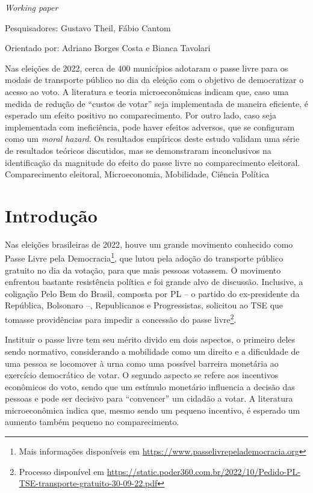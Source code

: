     {
      \noindent \textit{Working paper}
    
      \noindent Pesquisadores: Gustavo Theil, Fábio Cantom

      \noindent Orientado por: Adriano Borges Costa e Bianca Tavolari

        
    }
    {
        Nas eleições de 2022, cerca de 400 municípios adotaram o passe livre para os modais de transporte público no dia da eleição com o objetivo de democratizar o acesso ao voto. A literatura e teoria microeconômicas indicam que, caso uma medida de redução de ``custos de votar'' seja implementada de maneira eficiente, é esperado um efeito positivo no comparecimento. Por outro lado, caso seja implementada com ineficiência, pode haver efeitos adversos, que se configuram como um \textit{moral hazard}. Os resultados empíricos deste estudo validam uma série de resultados teóricos discutidos, mas se demonstraram inconclusivos na identificação da magnitude do efeito do passe livre no comparecimento eleitoral. 
    }
    {Comparecimento eleitoral, Microeconomia, Mobilidade, Ciência Política}

\section{Introdução}

Nas eleições brasileiras de 2022, houve um grande movimento conhecido como Passe Livre pela Democracia\footnote{Mais informações disponíveis em \url{https://www.passelivrepelademocracia.org}}, que lutou pela adoção do transporte público gratuito no dia da votação, para que mais pessoas votassem. O movimento enfrentou bastante resistência política e foi grande alvo de discussão. Inclusive, a coligação Pelo Bem do Brasil, composta por PL -- o partido do ex-presidente da República, Bolsonaro --, Republicanos e Progressistas, solicitou ao TSE que tomasse providências para impedir a concessão do passe livre\footnote{Processo disponível em \url{https://static.poder360.com.br/2022/10/Pedido-PL-TSE-transporte-gratuito-30-09-22.pdf}}.

Instituir o passe livre tem seu mérito divido em dois aspectos, o primeiro deles sendo normativo, considerando a mobilidade como um direito e a dificuldade de uma pessoa se locomover à urna como uma possível barreira monetária ao exercício democrático de votar. O segundo aspecto se refere aos incentivos econômicos do voto, sendo que um estímulo monetário influencia a decisão das pessoas e pode ser decisivo para ``convencer'' um cidadão a votar. A literatura microeconômica indica que, mesmo sendo um pequeno incentivo, é esperado um aumento também pequeno no comparecimento.

